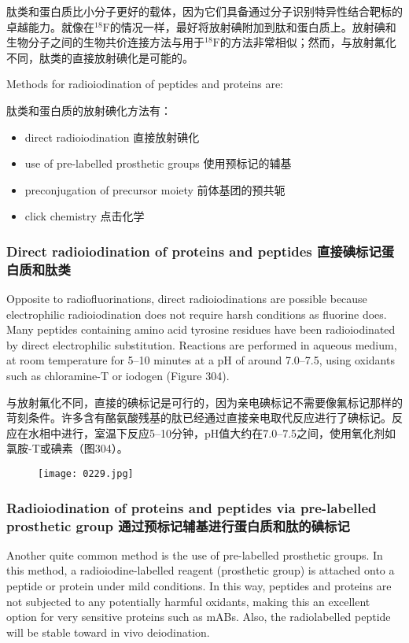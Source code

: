 \documentclass[dvipsnames, svgnames,a4paper,11pt]{article}
\begin{document}
肽类和蛋白质比小分子更好的载体，因为它们具备通过分子识别特异性结合靶标的卓越能力。就像在\(\mathrm{^{18}F}\)的情况一样，最好将放射碘附加到肽和蛋白质上。放射碘和生物分子之间的生物共价连接方法与用于\(\mathrm{^{18}F}\)的方法非常相似；然而，与放射氟化不同，肽类的直接放射碘化是可能的。

Methods for radioiodination of peptides and proteins are:  

肽类和蛋白质的放射碘化方法有：  

\begin{itemize}
  \item direct radioiodination 直接放射碘化
  \item use of pre-labelled prosthetic groups 使用预标记的辅基
  \item preconjugation of precursor moiety 前体基团的预共轭
  \item click chemistry 点击化学
\end{itemize}

\subsubsection{Direct radioiodination of proteins and peptides 直接碘标记蛋白质和肽类}  
Opposite to radiofluorinations, direct radioiodinations are possible because electrophilic radioiodination does not require harsh conditions as fluorine does. Many peptides containing amino acid tyrosine residues have been radioiodinated by direct electrophilic substitution. Reactions are performed in aqueous medium, at room temperature for 5–10 minutes at a pH of around 7.0–7.5, using oxidants such as chloramine-T or iodogen (Figure 304).  

与放射氟化不同，直接的碘标记是可行的，因为亲电碘标记不需要像氟标记那样的苛刻条件。许多含有酪氨酸残基的肽已经通过直接亲电取代反应进行了碘标记。反应在水相中进行，室温下反应5–10分钟，pH值大约在7.0–7.5之间，使用氧化剂如氯胺-T或碘素（图304）。  

\begin{figure}[h]
	\centering
    \texttt{[image: 0229.jpg]}  
     \label{fig304}
\end{figure}


\subsubsection{Radioiodination of proteins and peptides via pre-labelled prosthetic group 通过预标记辅基进行蛋白质和肽的碘标记}  
Another quite common method is the use of pre-labelled prosthetic groups. In this method, a radioiodine-labelled reagent (prosthetic group) is attached onto a peptide or protein under mild conditions. In this way, peptides and proteins are not subjected to any potentially harmful oxidants, making this an excellent option for very sensitive proteins such as mABs. Also, the radiolabelled peptide will be stable toward in vivo deiodination.  
\end{document}
